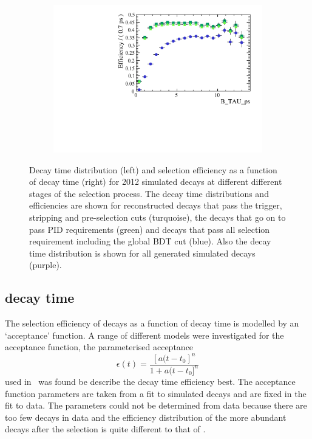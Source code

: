 \begin{figure}[htbp]
\begin{subfigure}[b]{0.48\textwidth}
       \includegraphics[width=\textwidth]{./Figs/LifetimeMeasurement/Accpt.pdf}
   \end{subfigure}
    \caption{Decay time distribution (left) and selection efficiency as a function of decay time (right) for 2012 \bsmumu simulated decays at different different stages of the selection process. The decay time distributions and efficiencies are shown for reconstructed decays that pass the trigger, stripping and pre-selection cuts (turquoise), the decays that go on to pass PID requirements (green) and decays that pass all selection requirement including the global BDT cut (blue). Also the decay time distribution is shown for all generated simulated decays (purple).} %
    \label{fig:accpteg}
\end{figure}

\subsection{\bsmumu decay time \pdf}
\label{sec:signalDTpdf}
The selection efficiency of \bsmumu decays as a function of decay time is modelled by an `acceptance' function. A range of different models were investigated for the acceptance function, the parameterised acceptance 
\begin{equation}
\epsilon(t) = \frac{[a(t - t_{0}]^{n}}{1 + a(t - t_{0}]^{n}}
\label{eq:accpt}
\end{equation}
used in~\cite{} was found be describe the \bsmumu decay time efficiency best. The acceptance function parameters are taken from a fit to simulated \bsmumu decays and are fixed in the fit to data. The parameters could not be determined from data because there are too few \bsmumu decays in data and the efficiency distribution of the more abundant \bhh decays after the selection is quite different to that of \bsmumu. 


